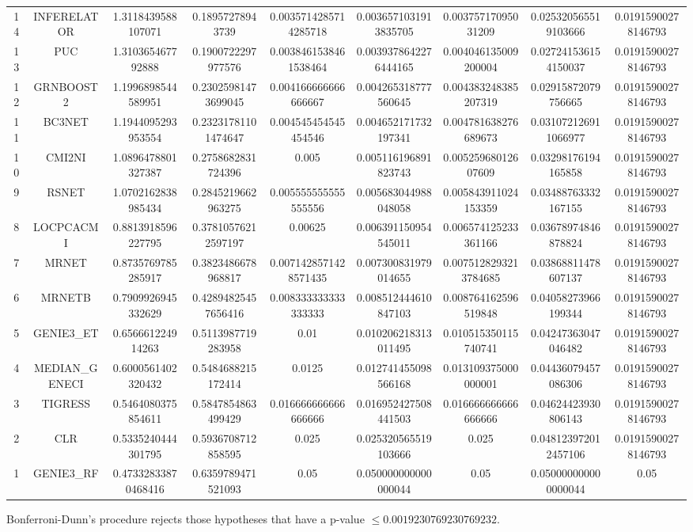 \documentclass[a4paper,10pt]{article}
\begin{document}
\begin{landscape}
\begin{table}[!htp]
\begin{tabular}{ccccccccc}
14&INFERELATOR&1.3118439588107071&0.18957278943739&0.0035714285714285718&0.0036571031913835705&0.00375717095031209&0.025320565519103666&0.01915900278146793\\
13&PUC&1.310365467792888&0.1900722297977576&0.0038461538461538464&0.0039378642276444165&0.004046135009200004&0.027241536154150037&0.01915900278146793\\
12&GRNBOOST2&1.1996898544589951&0.23025981473699045&0.004166666666666667&0.004265318777560645&0.004383248385207319&0.02915872079756665&0.01915900278146793\\
11&BC3NET&1.1944095293953554&0.23231781101474647&0.004545454545454546&0.004652171732197341&0.004781638276689673&0.031072126911066977&0.01915900278146793\\
10&CMI2NI&1.0896478801327387&0.2758682831724396&0.005&0.005116196891823743&0.00525968012607609&0.03298176194165858&0.01915900278146793\\
9&RSNET&1.0702162838985434&0.2845219662963275&0.005555555555555556&0.005683044988048058&0.005843911024153359&0.03488763332167155&0.01915900278146793\\
8&LOCPCACMI&0.8813918596227795&0.37810576212597197&0.00625&0.006391150954545011&0.006574125233361166&0.03678974846878824&0.01915900278146793\\
7&MRNET&0.8735769785285917&0.3823486678968817&0.0071428571428571435&0.007300831979014655&0.0075128293213784685&0.03868811478607137&0.01915900278146793\\
6&MRNETB&0.7909926945332629&0.42894825457656416&0.008333333333333333&0.008512444610847103&0.008764162596519848&0.04058273966199344&0.01915900278146793\\
5&GENIE3_ET&0.656661224914263&0.5113987719283958&0.01&0.010206218313011495&0.010515350115740741&0.04247363047046482&0.01915900278146793\\
4&MEDIAN_GENECI&0.6000561402320432&0.5484688215172414&0.0125&0.012741455098566168&0.013109375000000001&0.04436079457086306&0.01915900278146793\\
3&TIGRESS&0.5464080375854611&0.5847854863499429&0.016666666666666666&0.016952427508441503&0.016666666666666666&0.04624423930806143&0.01915900278146793\\
2&CLR&0.5335240444301795&0.5936708712858595&0.025&0.025320565519103666&0.025&0.048123972012457106&0.01915900278146793\\
1&GENIE3_RF&0.47332833870468416&0.6359789471521093&0.05&0.050000000000000044&0.05&0.050000000000000044&0.05\\
\hline
\end{tabular}
\end{table}
Bonferroni-Dunn's procedure rejects those hypotheses that have a p-value $\le0.0019230769230769232$.



\end{landscape}
\end{document}
